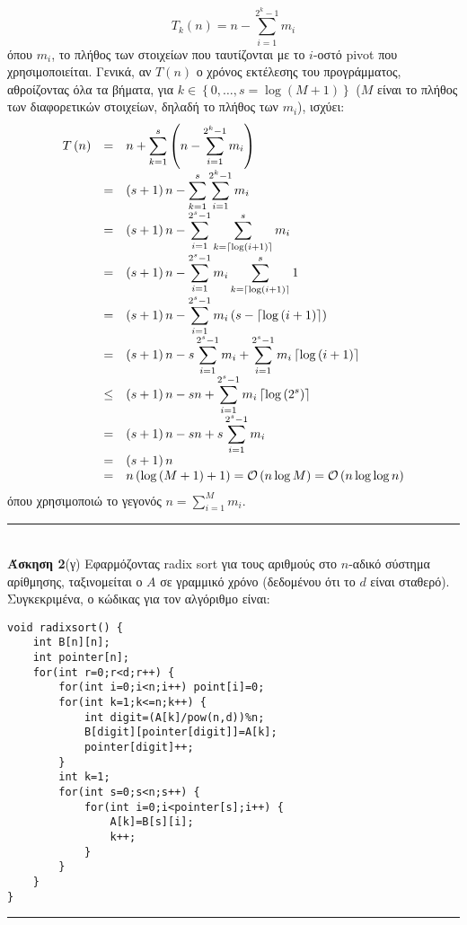 \documentclass[12pt]{article}
\newcommand\en[1]{\latintext #1\greektext}
\newcommand\bigOh{\mathcal{O}}
\newcommand{\HRule}{\rule{\linewidth}{0.1mm}}
\begin{document}
$$T_k\left(n\right)=n-\sum_{i=1}^{2^k-1}m_i$$
όπου $m_i$, το πλήθος των στοιχείων που ταυτίζονται με το $i$-οστό \en{pivot} που χρησιμοποιείται. Γενικά, αν $T\left(n\right)$ ο χρόνος εκτέλεσης του προγράμματος, αθροίζοντας όλα τα βήματα, για $k\in\left\{0,\ldots,s=\log\left(M+1\right)\right\}$ ($M$ είναι το πλήθος των διαφορετικών στοιχείων, δηλαδή το πλήθος των $m_i$), ισχύει:
$$\begin{array}{>{\displaystyle}rc>{\displaystyle}l}T\left(n\right)
&=&n+\sum_{k=1}^s\left(n-\sum_{i=1}^{2^k-1}m_i\right)\\
&=&\left(s+1\right)n-\sum_{k=1}^s\sum_{i=1}^{2^k-1}m_i\\
&=&\left(s+1\right)n-\sum_{i=1}^{2^s-1}\sum_{k=\left\lceil\log\left(i+1\right)\right\rceil}^sm_i\\
&=&\left(s+1\right)n-\sum_{i=1}^{2^s-1}m_i\sum_{k=\left\lceil\log\left(i+1\right)\right\rceil}^s1\\
&=&\left(s+1\right)n-\sum_{i=1}^{2^s-1}m_i\left(s-\left\lceil\log\left(i+1\right)\right\rceil\right)\\
&=&\left(s+1\right)n-s\sum_{i=1}^{2^s-1}m_i+\sum_{i=1}^{2^s-1}m_i\left\lceil\log\left(i+1\right)\right\rceil\\
&\leq&\left(s+1\right)n-sn+\sum_{i=1}^{2^s-1}m_i\left\lceil\log\left(2^s\right)\right\rceil\\
&=&\left(s+1\right)n-sn+s\sum_{i=1}^{2^s-1}m_i\\
&=&\left(s+1\right)n\\
&=&n\left(\log\left(M+1\right)+1\right)=\bigOh\left(n\log M\right)=\bigOh\left(n\log\log n\right)\\
\end{array}$$
όπου χρησιμοποιώ το γεγονός $n=\sum_{i=1}^Mm_i$.\\
\HRule\\
{\bf Άσκηση 2}(γ) Εφαρμόζοντας \en{radix sort} για τους αριθμούς στο $n$-αδικό σύστημα αρίθμησης, ταξινομείται ο $A$ σε γραμμικό χρόνο (δεδομένου ότι το $d$ είναι σταθερό). Συγκεκριμένα, ο κώδικας για τον αλγόριθμο είναι:
\latintext
\begin{lstlisting}
void radixsort() {
	int B[n][n];
	int pointer[n];
	for(int r=0;r<d;r++) {
		for(int i=0;i<n;i++) point[i]=0;
		for(int k=1;k<=n;k++) {
			int digit=(A[k]/pow(n,d))%n;
			B[digit][pointer[digit]]=A[k];
			pointer[digit]++;
		}
		int k=1;
		for(int s=0;s<n;s++) {
			for(int i=0;i<pointer[s];i++) {
				A[k]=B[s][i];
				k++;
			}
		}
	}
}
\end{lstlisting}
\greektext
\HRule\\
\end{document}
